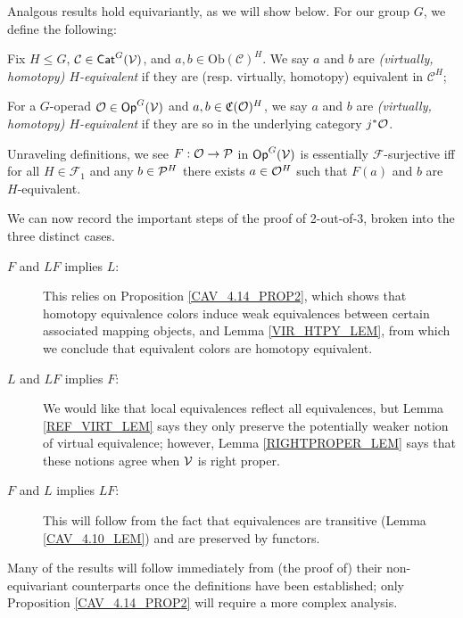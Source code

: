 \documentclass[a4paper,10pt
,draft
]{article}%
\renewcommand{\F}{\mathcal F}
\renewcommand{\1}{\eta}%
\begin{document}
Analgous results hold equivariantly, as we will show below. For our group $G$, we define the following:
\begin{definition}
      \label{EQUIVG_DEF}
      Fix $H \leq G$, $\mathcal{C}\in \Cat^G(\V)$, and $a,b\in \mathrm{Ob}(\mathcal{C})^H$.
      We say $a$ and $b$ are 
      \textit{(virtually, homotopy) $H$-equivalent}
      if they are (resp. virtually, homotopy) equivalent in $\mathcal{C}^H$;
      
      For a $G$-operad $\O\in \mathsf{Op}^G(\V)$ and $a,b\in \C(\O)^H$, we say $a$ and $b$ are
      {\em (virtually, homotopy) $H$-equivalent}
      if they are so in the underlying category $j^*\O$. 
\end{definition}


\begin{remark}
      \label{ESS_SUR_REM}
      Unraveling definitions, we see
      $F: \O \to \P$ in $\Op^G(\V)$ is essentially $\F$-surjective iff
      for all $H \in \F_1$ and any $b \in \P^H$ there exists $a \in \O^H$ such that $F(a)$ and $b$ are $H$-equivalent.
\end{remark}

We can now record the important steps of the proof of 2-out-of-3, broken into the three distinct cases.
\begin{description}
\item [$F$ and $LF$ implies $L$:] This relies on Proposition \ref{CAV_4.14_PROP2}, which shows that
      homotopy equivalence colors induce weak equivalences between certain associated mapping objects,
      and Lemma \ref{VIR_HTPY_LEM}, from which we conclude that equivalent colors are homotopy equivalent.
\item [$L$ and $LF$ implies $F$:] We would like that local equivalences reflect all equivalences, but Lemma \ref{REF_VIRT_LEM} says they only preserve the potentially weaker notion of virtual equivalence;
      however, Lemma \ref{RIGHTPROPER_LEM} says that these notions agree when $\V$ is right proper.
\item [$F$ and $L$ implies $LF$:] This will follow from the fact that equivalences are transitive (Lemma \ref{CAV_4.10_LEM}) and are preserved by functors.
\end{description}
%
Many of the results will follow immediately from (the proof of) their non-equivariant counterparts once the definitions have been established;
only Proposition \ref{CAV_4.14_PROP2} will require a more complex analysis.
\end{document}
